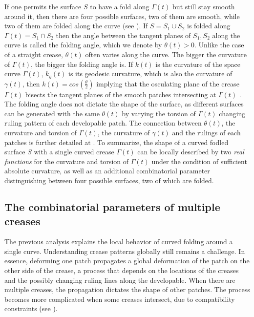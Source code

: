 If one permits the surface $S$ to have a fold along $\Gamma(t)$ but still stay smooth around it, then there are four possible surfaces, two of them are smooth, while two of them are folded along the curve (see ). If $S = S_1 \cup S_2$ is folded along $\Gamma(t) = S_1 \cap S_2$ then the angle between the tangent planes of $S_1,S_2$ along the curve is called the folding angle, which we denote by $\theta(t) > 0$. Unlike the case of a straight crease, $\theta(t)$ often varies along the curve.  The bigger the curvature of $\Gamma(t)$, the bigger the folding angle is. If $k(t)$ is the curvature of the space curve $\Gamma(t)$, $k_g(t)$ is its geodesic curvature, which is also the curvature of $\gamma(t)$, then $k(t) = cos(\frac{\theta}{2})$ implying that the osculating plane of the crease $\Gamma(t)$ bisects the tangent planes of the smooth patches intersecting at $\Gamma(t)$ \cite{curved_folding_kilian,duncan_folded}. The folding angle does not dictate the shape of the surface, as different surfaces can be generated with the same $\theta(t)$ by varying the torsion of $\Gamma(t)$ changing ruling pattern of each developable patch. The connection between $\theta(t)$, the curvature and torsion of $\Gamma(t)$, the curvature of $\gamma(t)$ and the rulings of each patches is further detailed at \cite{demaine2018conic}.
To summarize, the shape of a curved fodled surface $S$ with a single curved crease $\Gamma(t)$ can be locally described by two \textit{real functions} for the curvature and torsion of $\Gamma(t)$ under the condition of sufficient absolute curvature, as well as an additional combinatorial parameter distinguishing between four possible surfaces, two of which are folded.
 
\subsection{The combinatorial parameters of multiple creases}
The previous analysis explains the local behavior of curved folding around a single curve. Understanding crease patterns globally still remains a challenge. In essence, deforming one patch propagates a global deformation of the patch on the other side of the crease, a process that depends on the locations of the creases and the possibly changing ruling lines along the developable. When there are multiple creases, the propagation dictates the shape of other patches. The process becomes more complicated when some creases intersect, due to compatibility constraints (see ). 


